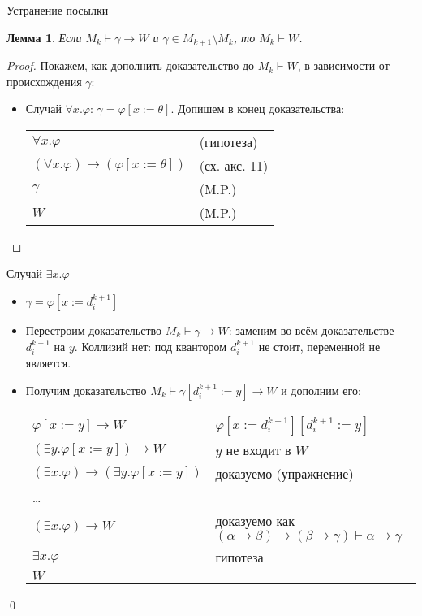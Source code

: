 \documentclass[aspectratio=169]{beamer}
\newtheorem{lmm}{Лемма}[section]
\begin{document}
\begin{frame}{Устранение посылки}
\begin{lmm}
Если $M_k\vdash\gamma\to W$ и $\gamma\in M_{k+1}\setminus M_k$, то $M_k\vdash W$.
\end{lmm}
\begin{proof}
Покажем, как дополнить доказательство до $M_k\vdash W$, в зависимости от происхождения $\gamma$:
\pause

\begin{itemize}
\item Случай $\forall x.\varphi$: $\gamma = \varphi[x:=\theta]$.
\pause
Допишем в конец доказательства:

\begin{tabular}{ll}
$\forall x.\varphi$ & (гипотеза)\\\pause
$(\forall x.\varphi)\to(\varphi[x:=\theta])$ & (сх. акс. 11)\\\pause
$\gamma$  & (M.P.) \\\pause
$W$ & (M.P.)
\end{tabular}
\end{itemize}
\end{proof}
\end{frame}

\begin{frame}{Случай $\exists x.\varphi$}
\begin{itemize}\item $\gamma = \varphi[x := d^{k+1}_i]$\pause


\item Перестроим доказательство $M_k\vdash \gamma\to W$:
заменим во всём доказательстве $d^{k+1}_i$ на $y$.
Коллизий нет: под квантором $d^{k+1}_i$ не стоит, переменной не является. \pause
\item Получим доказательство $M_k\vdash \gamma[d^{k+1}_i := y]\to W$ и дополним его:

\begin{tabular}{ll}
$\varphi[x := y]\to W$ & $\varphi[x := d^{k+1}_i][d^{k+1}_i := y]$\\\pause
$(\exists y.\varphi[x:=y])\to W$ & $y$ не входит в $W$ \\\pause
$(\exists x.\varphi)\to(\exists y.\varphi[x:=y])$ & доказуемо (упражнение)\\\pause
 \dots \\
$(\exists x.\varphi)\to W$ & доказуемо как $(\alpha\to\beta)\to(\beta\to\gamma)\vdash\alpha\to\gamma$ \\\pause
$\exists x.\varphi$ & гипотеза\\\pause
$W$
\end{tabular}
\end{itemize}
\qed
\end{frame}
\end{document}
